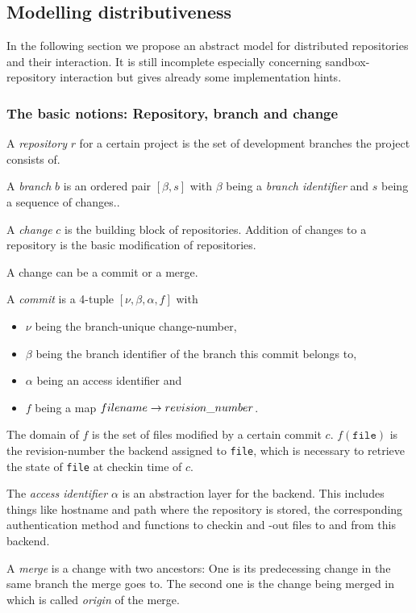 \documentclass[fleqn, 10pt, a4paper]{report}
\begin{document}
\subsection{Modelling distributiveness}

In the following section we propose an abstract model for distributed
repositories and their interaction. It is still incomplete
especially concerning sandbox-repository interaction but gives already
some implementation hints.

\subsubsection{The basic notions: Repository, branch and change}

A \emph{repository} $r$ for a certain project is the set of development
branches the project consists of.

A \emph{branch} $b$ is an ordered pair $[\beta, s]$ with $\beta$ being
a \emph{branch identifier} and $s$ being
a sequence of changes..

A \emph{change} $c$ is the building block of repositories.
Addition of changes to a repository is the basic modification
of repositories.

A change can be a commit or a merge.

A \emph{commit} is a 4-tuple $[\nu, \beta, \alpha, f]$ with
\begin{itemize}
\item $\nu$ being the branch-unique change-number,
\item $\beta$ being the branch identifier of the branch
this commit belongs to,
\item $\alpha$ being an access identifier and
\item $f$ being a map $\mathnormal{filename} \rightarrow
\mathnormal{revision\_number}$.
\end{itemize}

The domain of $f$ is the set of files modified by a certain
commit $c$. $f(\mathtt{file})$ is the revision-number the
backend assigned to \texttt{file}, which is necessary to
retrieve the state of \texttt{file} at checkin time of $c$.

The \emph{access identifier} $\alpha$ is an abstraction layer for the
backend. This includes things like hostname and path where the
repository is stored, the corresponding authentication method
and functions to checkin and -out files to and from this backend.

A \emph{merge} is a change with two ancestors:
One is its predecessing change in the same branch the merge
goes to. The second one is the change being merged in which is
called \emph{origin} of the merge.
\end{document}

